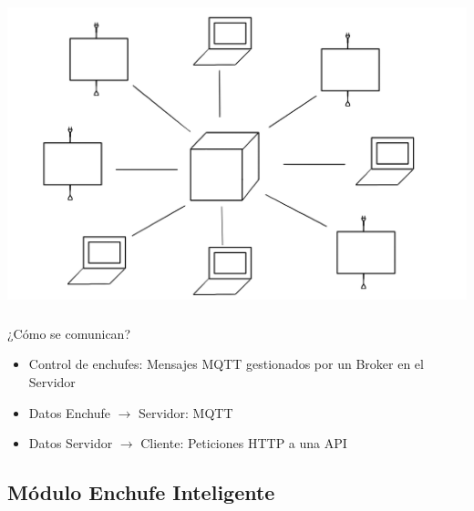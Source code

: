 \documentclass[compress, aspectratio=169]{beamer} %
\begin{document}
\begin{frame}
  \transdissolve[duration=1]
  \frametitle{\insertsubsection}
  \centering\includegraphics[scale=0.7]{img/esquema_estrella.png}
\end{frame}

\begin{frame}
  \transdissolve[duration=1]
  \frametitle{\insertsubsection}
  ¿Cómo se comunican?
  \begin{itemize}
    \item{Control de enchufes: Mensajes MQTT gestionados por un Broker
      en el Servidor}
    \item{Datos Enchufe $\rightarrow$ Servidor: MQTT}
    \item{Datos Servidor $\rightarrow$ Cliente: Peticiones HTTP a
      una API}
  \end{itemize}
\end{frame}


\subsection{Módulo Enchufe Inteligente}
\begin{frame}
  \transdissolve[duration=1]
  \frametitle{\insertsubsection}
\end{frame}
\end{document}
